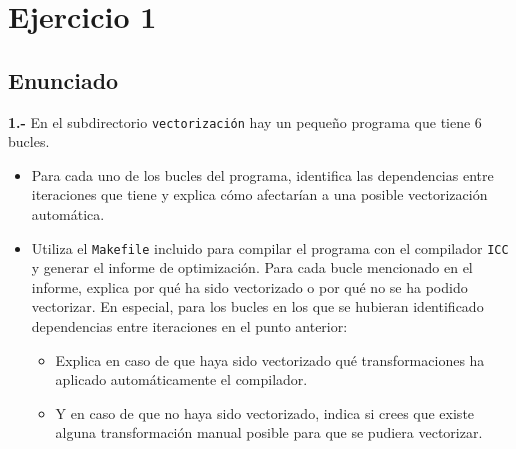 \section{Ejercicio 1}
\subsection{Enunciado}
\begin{ejer}
    \textbf{1.-} En el subdirectorio \texttt{vectorización} hay un pequeño programa que tiene 6 bucles.
    \begin{itemize}
        \item Para cada uno de los bucles del programa, identifica las dependencias entre iteraciones que tiene
    y explica cómo afectarían a una posible vectorización automática.
        \item Utiliza el \texttt{Makefile} incluido para compilar el programa con el compilador \texttt{ICC} y generar
    el informe de optimización. Para cada bucle mencionado en el informe, explica por qué ha sido vectorizado o por qué no 
    se ha podido vectorizar. En especial, para los bucles en los que se hubieran identificado dependencias entre iteraciones
     en el punto anterior:
        \begin{itemize}
            \item Explica en caso de que haya sido vectorizado qué transformaciones ha aplicado automáticamente el compilador.
            \item Y en caso de que no haya sido vectorizado, indica si crees que existe alguna transformación manual posible para
            que se pudiera vectorizar.
        \end{itemize}
    \end{itemize}
\end{ejer}




